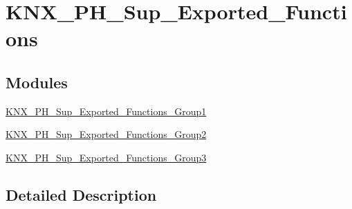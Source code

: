 \hypertarget{group___k_n_x___p_h___sup___exported___functions}{}\section{K\+N\+X\+\_\+\+P\+H\+\_\+\+Sup\+\_\+\+Exported\+\_\+\+Functions}
\label{group___k_n_x___p_h___sup___exported___functions}
\subsection*{Modules}
\begin{DoxyCompactItemize}
\item 
\hyperlink{group___k_n_x___p_h___sup___exported___functions___group1}{K\+N\+X\+\_\+\+P\+H\+\_\+\+Sup\+\_\+\+Exported\+\_\+\+Functions\+\_\+\+Group1}
\item 
\hyperlink{group___k_n_x___p_h___sup___exported___functions___group2}{K\+N\+X\+\_\+\+P\+H\+\_\+\+Sup\+\_\+\+Exported\+\_\+\+Functions\+\_\+\+Group2}
\item 
\hyperlink{group___k_n_x___p_h___sup___exported___functions___group3}{K\+N\+X\+\_\+\+P\+H\+\_\+\+Sup\+\_\+\+Exported\+\_\+\+Functions\+\_\+\+Group3}
\end{DoxyCompactItemize}


\subsection{Detailed Description}
